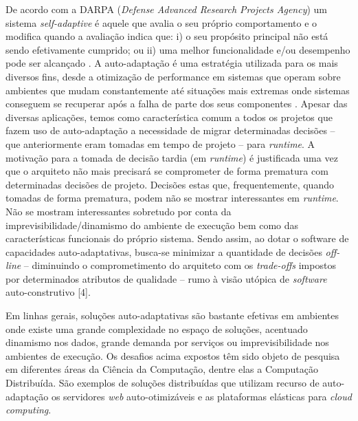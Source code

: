 \documentclass[conference]{IEEEtran}
\begin{document}
De acordo com a DARPA (\textit{Defense Advanced Research Projects Agency}) um sistema \textit{self-adaptive} é aquele que avalia o seu próprio comportamento e o modifica quando a avaliação indica que: i) o seu propósito principal não está sendo efetivamente cumprido; ou ii) uma melhor funcionalidade e/ou desempenho pode ser alcançado \cite{DARPA-selfadaptive}. A auto-adaptação é uma estratégia utilizada para os mais diversos fins, desde a otimização de performance em sistemas que operam sobre ambientes que mudam constantemente até situações mais extremas onde sistemas conseguem se recuperar após a falha de parte dos seus componentes \cite{DBLP:conf/dagstuhl/WeynsSGMMPWAGG10}. Apesar das diversas aplicações, temos como característica comum a todos os projetos que fazem uso de auto-adaptação a necessidade de migrar determinadas decisões -- que anteriormente eram tomadas em tempo de projeto -- para \textit{runtime}. A motivação para a tomada de decisão tardia (em \textit{runtime}) é justificada uma vez que o arquiteto não mais precisará se comprometer de forma prematura com determinadas decisões de projeto. Decisões estas que, frequentemente, quando tomadas de forma prematura, podem não se mostrar interessantes em \textit{runtime}. Não se mostram interessantes sobretudo por conta da imprevisibilidade/dinamismo do ambiente de execução bem como das características funcionais do próprio sistema. Sendo assim, ao dotar o software de capacidades auto-adaptativas, busca-se minimizar a quantidade de decisões \textit{off-line} -- diminuindo o comprometimento do arquiteto com os \textit{trade-offs} impostos por determinados atributos de qualidade -- rumo à visão utópica de \textit{software} auto-construtivo [4].

Em linhas gerais, soluções auto-adaptativas são bastante efetivas em ambientes onde existe uma grande complexidade no espaço de soluções, acentuado dinamismo nos dados, grande demanda por serviços ou imprevisibilidade nos ambientes de execução. Os desafios acima expostos têm sido objeto de pesquisa em diferentes áreas da Ciência da Computação, dentre elas a Computação Distribuída. São exemplos de soluções distribuídas que utilizam recurso de auto-adaptação os servidores \textit{web} auto-otimizáveis e as plataformas elásticas para \textit{cloud computing}.
\end{document}
